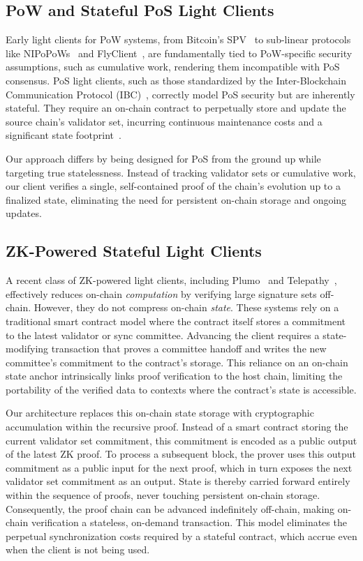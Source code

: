 \documentclass[runningheads]{llncs}
\begin{document}
\subsection{PoW and Stateful PoS Light Clients}
Early light clients for PoW systems, from Bitcoin's SPV~\cite{Nakamoto2008Bitcoin} to sub-linear protocols like NIPoPoWs~\cite{Kiayias2020Nipopow} and FlyClient~\cite{Bunz2020FlyClient}, are fundamentally tied to PoW-specific security assumptions, such as cumulative work, rendering them incompatible with PoS consensus. PoS light clients, such as those standardized by the Inter-Blockchain Communication Protocol (IBC)~\cite{Goes2020IBC}, correctly model PoS security but are inherently stateful. They require an on-chain contract to perpetually store and update the source chain's validator set, incurring continuous maintenance costs and a significant state footprint~\cite{Goel2022IBCZKSnarks}.

Our approach differs by being designed for PoS from the ground up while targeting true statelessness. Instead of tracking validator sets or cumulative work, our client verifies a single, self-contained proof of the chain's evolution up to a finalized state, eliminating the need for persistent on-chain storage and ongoing updates.

\subsection{ZK-Powered Stateful Light Clients}
A recent class of ZK-powered light clients, including Plumo~\cite{Gabizon2021Plumo} and Telepathy~\cite{Succinct2023Telepathy}, effectively reduces on-chain \textit{computation} by verifying large signature sets off-chain. However, they do not compress on-chain \textit{state}. These systems rely on a traditional smart contract model where the contract itself stores a commitment to the latest validator or sync committee. Advancing the client requires a state-modifying transaction that proves a committee handoff and writes the new committee's commitment to the contract's storage. This reliance on an on-chain state anchor intrinsically links proof verification to the host chain, limiting the portability of the verified data to contexts where the contract's state is accessible.

Our architecture replaces this on-chain state storage with cryptographic accumulation within the recursive proof. Instead of a smart contract storing the current validator set commitment, this commitment is encoded as a public output of the latest ZK proof. To process a subsequent block, the prover uses this output commitment as a public input for the next proof, which in turn exposes the next validator set commitment as an output. State is thereby carried forward entirely within the sequence of proofs, never touching persistent on-chain storage. Consequently, the proof chain can be advanced indefinitely off-chain, making on-chain verification a stateless, on-demand transaction. This model eliminates the perpetual synchronization costs required by a stateful contract, which accrue even when the client is not being used.
\end{document}
